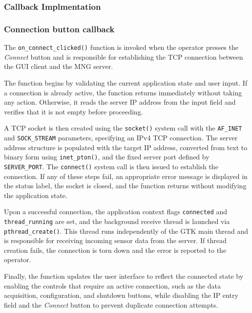 \subsubsection{Callback Implmentation}
\subsubsection{Connection button callback}
The \texttt{on\_connect\_clicked()} function is invoked when the operator
presses the \textit{Connect} button and is responsible for establishing
the TCP connection between the GUI client and the MNG server.

The function begins by validating the current application state and user
input. If a connection is already active, the function returns immediately
without taking any action. Otherwise, it reads the server IP address from
the input field and verifies that it is not empty before proceeding.

A TCP socket is then created using the \texttt{socket()} system call with
the \texttt{AF\_INET} and \texttt{SOCK\_STREAM} parameters, specifying an
IPv4 TCP connection. The server address structure is populated with the
target IP address, converted from text to binary form using
\texttt{inet\_pton()}, and the fixed server port defined by
\texttt{SERVER\_PORT}. The \texttt{connect()} system call is then issued
to establish the connection. If any of these steps fail, an appropriate
error message is displayed in the status label, the socket is closed, and
the function returns without modifying the application state.

Upon a successful connection, the application context flags
\texttt{connected} and \texttt{thread\_running} are set, and the
background receive thread is launched via \texttt{pthread\_create()}.
This thread runs independently of the GTK main thread and is responsible
for receiving incoming sensor data from the server. If thread creation
fails, the connection is torn down and the error is reported to the
operator.

Finally, the function updates the user interface to reflect the connected
state by enabling the controls that require an active connection, such as
the data acquisition, configuration, and shutdown buttons, while disabling
the IP entry field and the \textit{Connect} button to prevent duplicate
connection attempts.

